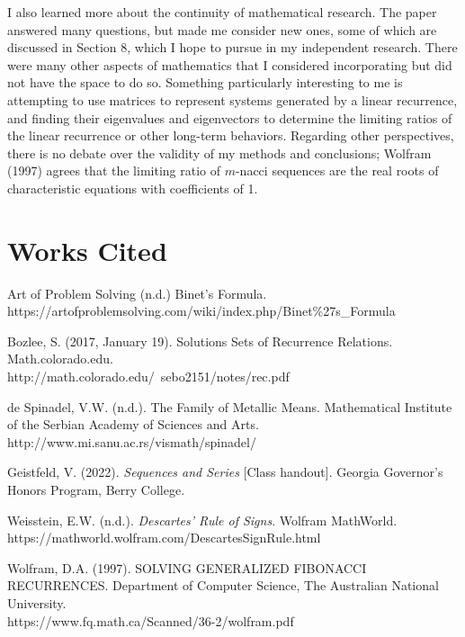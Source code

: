 \documentclass[11pt]{article}
\begin{document}
I also learned more about the continuity of mathematical research. The paper answered many questions, but made me consider new ones, some of which are discussed in Section 8, which I hope to pursue in my independent research. There were many other aspects of mathematics that I considered incorporating but did not have the space to do so. Something particularly interesting to me is attempting to use matrices to represent systems generated by a linear recurrence, and finding their eigenvalues and eigenvectors to determine the limiting ratios of the linear recurrence or other long-term behaviors.
Regarding other perspectives, there is no debate over the validity of my methods and conclusions; Wolfram (1997) agrees that the limiting ratio of \(m\)-nacci sequences are the real roots of characteristic equations with coefficients of 1. 

\newpage 
\thispagestyle{empty}

\section{Works Cited}

\begin{hangparas}{.25in}{1}
    Art of Problem Solving (n.d.) Binet's Formula. \\ https://artofproblemsolving.com/wiki/index.php/Binet\%27s\_Formula

    Bozlee, S. (2017, January 19). Solutions Sets of Recurrence Relations. Math.colorado.edu. \\ http://math.colorado.edu/~sebo2151/notes/rec.pdf

    de Spinadel, V.W. (n.d.). The Family of Metallic Means. Mathematical Institute of the Serbian Academy of Sciences and Arts. \\ http://www.mi.sanu.ac.rs/vismath/spinadel/

    Geistfeld, V. (2022). \emph{Sequences and Series} [Class handout]. Georgia Governor's Honors Program, Berry College.
    
    Weisstein, E.W. (n.d.). \emph{Descartes' Rule of Signs}. Wolfram MathWorld. \\ https://mathworld.wolfram.com/DescartesSignRule.html

    Wolfram, D.A. (1997). SOLVING GENERALIZED FIBONACCI RECURRENCES. Department of Computer Science, The Australian National University. \\ https://www.fq.math.ca/Scanned/36-2/wolfram.pdf
\end{hangparas}
\end{document}
